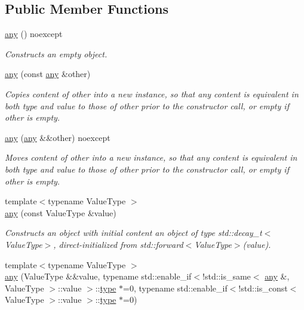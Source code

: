 \subsection*{Public Member Functions}
\begin{DoxyCompactItemize}
\item 
\mbox{\hyperlink{classbfl_1_1any_1_1any_a55b5d940fdb6f1e7215332b7d97c6365}{any}} () noexcept
\begin{DoxyCompactList}\small\item\em Constructs an empty object. \end{DoxyCompactList}\item 
\mbox{\hyperlink{classbfl_1_1any_1_1any_a85f150e4daa7d447586df005cc8d9846}{any}} (const \mbox{\hyperlink{classbfl_1_1any_1_1any}{any}} \&other)
\begin{DoxyCompactList}\small\item\em Copies content of other into a new instance, so that any content is equivalent in both type and value to those of other prior to the constructor call, or empty if other is empty. \end{DoxyCompactList}\item 
\mbox{\hyperlink{classbfl_1_1any_1_1any_ab3caf90d0d0e9a57a9cacc690fa57bf5}{any}} (\mbox{\hyperlink{classbfl_1_1any_1_1any}{any}} \&\&other) noexcept
\begin{DoxyCompactList}\small\item\em Moves content of other into a new instance, so that any content is equivalent in both type and value to those of other prior to the constructor call, or empty if other is empty. \end{DoxyCompactList}\item 
{\footnotesize template$<$typename Value\+Type $>$ }\\\mbox{\hyperlink{classbfl_1_1any_1_1any_a71949c13d541881e9e61de1064710616}{any}} (const Value\+Type \&value)
\begin{DoxyCompactList}\small\item\em Constructs an object with initial content an object of type std\+::decay\+\_\+t$<$\+Value\+Type$>$, direct-\/initialized from std\+::forward$<$\+Value\+Type$>$(value). \end{DoxyCompactList}\item 
{\footnotesize template$<$typename Value\+Type $>$ }\\\mbox{\hyperlink{classbfl_1_1any_1_1any_acb42da22b210ada4113f26025548175c}{any}} (Value\+Type \&\&value, typename std\+::enable\+\_\+if$<$!std\+::is\+\_\+same$<$ \mbox{\hyperlink{classbfl_1_1any_1_1any}{any}} \&, Value\+Type $>$\+::value $>$\+::\mbox{\hyperlink{classbfl_1_1any_1_1any_ad84c3b30ce2ed9d04fe28465b60f2500}{type}} $\ast$=0, typename std\+::enable\+\_\+if$<$!std\+::is\+\_\+const$<$ Value\+Type $>$\+::value $>$\+::\mbox{\hyperlink{classbfl_1_1any_1_1any_ad84c3b30ce2ed9d04fe28465b60f2500}{type}} $\ast$=0)

\end{DoxyCompactItemize}
